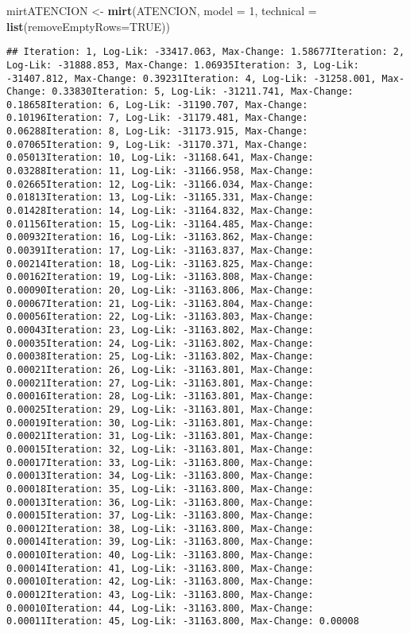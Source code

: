 \documentclass[
  10pt,
  spanish,
]{article}
\newenvironment{Shaded}{\begin{snugshade}}{\end{snugshade}}
\newcommand{\DataTypeTok}[1]{\textcolor[rgb]{0.13,0.29,0.53}{#1}}
\newcommand{\DecValTok}[1]{\textcolor[rgb]{0.00,0.00,0.81}{#1}}
\newcommand{\KeywordTok}[1]{\textcolor[rgb]{0.13,0.29,0.53}{\textbf{#1}}}
\newcommand{\NormalTok}[1]{#1}
\newcommand{\OtherTok}[1]{\textcolor[rgb]{0.56,0.35,0.01}{#1}}
\newcommand{\StringTok}[1]{\textcolor[rgb]{0.31,0.60,0.02}{#1}}
\begin{document}
\begin{Shaded}
\begin{Highlighting}[]
\NormalTok{mirtATENCION <-}\StringTok{ }\KeywordTok{mirt}\NormalTok{(ATENCION, }\DataTypeTok{model =} \DecValTok{1}\NormalTok{, }\DataTypeTok{technical =} \KeywordTok{list}\NormalTok{(}\DataTypeTok{removeEmptyRows=}\OtherTok{TRUE}\NormalTok{)) }
\end{Highlighting}
\end{Shaded}

\begin{verbatim}
## Iteration: 1, Log-Lik: -33417.063, Max-Change: 1.58677Iteration: 2, Log-Lik: -31888.853, Max-Change: 1.06935Iteration: 3, Log-Lik: -31407.812, Max-Change: 0.39231Iteration: 4, Log-Lik: -31258.001, Max-Change: 0.33830Iteration: 5, Log-Lik: -31211.741, Max-Change: 0.18658Iteration: 6, Log-Lik: -31190.707, Max-Change: 0.10196Iteration: 7, Log-Lik: -31179.481, Max-Change: 0.06288Iteration: 8, Log-Lik: -31173.915, Max-Change: 0.07065Iteration: 9, Log-Lik: -31170.371, Max-Change: 0.05013Iteration: 10, Log-Lik: -31168.641, Max-Change: 0.03288Iteration: 11, Log-Lik: -31166.958, Max-Change: 0.02665Iteration: 12, Log-Lik: -31166.034, Max-Change: 0.01813Iteration: 13, Log-Lik: -31165.331, Max-Change: 0.01428Iteration: 14, Log-Lik: -31164.832, Max-Change: 0.01156Iteration: 15, Log-Lik: -31164.485, Max-Change: 0.00932Iteration: 16, Log-Lik: -31163.862, Max-Change: 0.00391Iteration: 17, Log-Lik: -31163.837, Max-Change: 0.00214Iteration: 18, Log-Lik: -31163.825, Max-Change: 0.00162Iteration: 19, Log-Lik: -31163.808, Max-Change: 0.00090Iteration: 20, Log-Lik: -31163.806, Max-Change: 0.00067Iteration: 21, Log-Lik: -31163.804, Max-Change: 0.00056Iteration: 22, Log-Lik: -31163.803, Max-Change: 0.00043Iteration: 23, Log-Lik: -31163.802, Max-Change: 0.00035Iteration: 24, Log-Lik: -31163.802, Max-Change: 0.00038Iteration: 25, Log-Lik: -31163.802, Max-Change: 0.00021Iteration: 26, Log-Lik: -31163.801, Max-Change: 0.00021Iteration: 27, Log-Lik: -31163.801, Max-Change: 0.00016Iteration: 28, Log-Lik: -31163.801, Max-Change: 0.00025Iteration: 29, Log-Lik: -31163.801, Max-Change: 0.00019Iteration: 30, Log-Lik: -31163.801, Max-Change: 0.00021Iteration: 31, Log-Lik: -31163.801, Max-Change: 0.00015Iteration: 32, Log-Lik: -31163.801, Max-Change: 0.00017Iteration: 33, Log-Lik: -31163.800, Max-Change: 0.00013Iteration: 34, Log-Lik: -31163.800, Max-Change: 0.00018Iteration: 35, Log-Lik: -31163.800, Max-Change: 0.00013Iteration: 36, Log-Lik: -31163.800, Max-Change: 0.00015Iteration: 37, Log-Lik: -31163.800, Max-Change: 0.00012Iteration: 38, Log-Lik: -31163.800, Max-Change: 0.00014Iteration: 39, Log-Lik: -31163.800, Max-Change: 0.00010Iteration: 40, Log-Lik: -31163.800, Max-Change: 0.00014Iteration: 41, Log-Lik: -31163.800, Max-Change: 0.00010Iteration: 42, Log-Lik: -31163.800, Max-Change: 0.00012Iteration: 43, Log-Lik: -31163.800, Max-Change: 0.00010Iteration: 44, Log-Lik: -31163.800, Max-Change: 0.00011Iteration: 45, Log-Lik: -31163.800, Max-Change: 0.00008
\end{verbatim}
\end{document}
